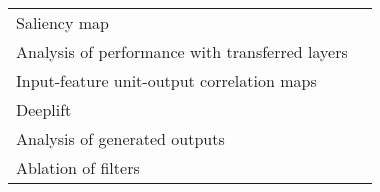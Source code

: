 \begin{tabular}{ll}
Saliency map                                           &                                                                                                                                                                               \cite{Vilamala2017} \\
Analysis of performance with transferred layers        &                                                                                                                                                                            \cite{Hajinoroozi2017} \\
Input-feature unit-output correlation maps             &                                                                                                                                                                          \cite{Schirrmeister2017} \\
Deeplift                                               &                                                                                                                                                                                \cite{Lawhern2018} \\
Analysis of generated outputs                          &                                                                                                                                                                               \cite{Hartmann2018} \\
Ablation of filters                                    &                                                                                                                                                                                \cite{Lawhern2018} \\
\bottomrule
\end{tabular}
